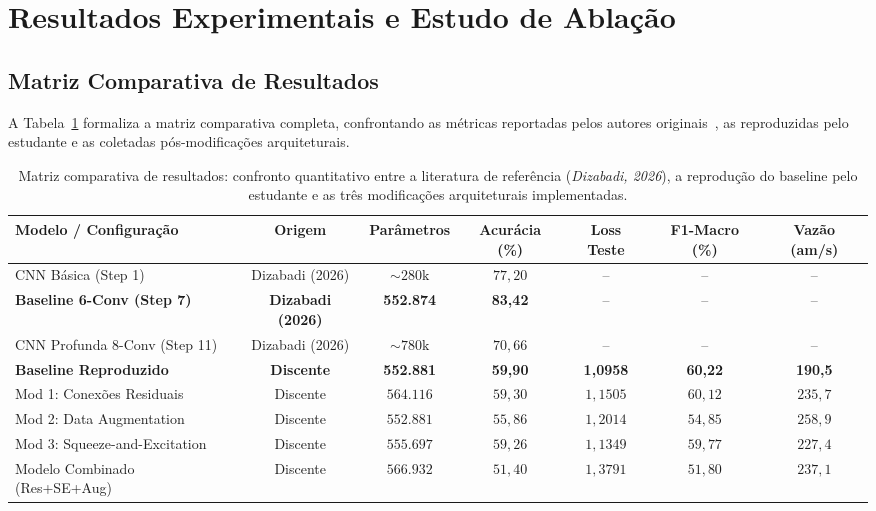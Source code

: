 \documentclass[runningheads]{llncs}
\begin{document}
\section{Resultados Experimentais e Estudo de Abla\c{c}\~{a}o}
\label{sec:resultados}

\subsection{Matriz Comparativa de Resultados}
A Tabela~\ref{tab:matriz_resultados} formaliza a matriz comparativa completa, confrontando as m\'{e}tricas reportadas pelos autores originais~\cite{dizabadi2026empirical}, as reproduzidas pelo estudante e as coletadas p\'{o}s-modifica\c{c}\~{o}es arquiteturais.

\begin{table}[t]
\centering
\caption{Matriz comparativa de resultados: confronto quantitativo entre a literatura de refer\^{e}ncia (\textit{Dizabadi, 2026}), a reprodu\c{c}\~{a}o do baseline pelo estudante e as tr\^{e}s modifica\c{c}\~{o}es arquiteturais implementadas.}
\label{tab:matriz_resultados}
\setlength{\tabcolsep}{5pt}
\small
\begin{tabular}{lcccccc}
\toprule
\textbf{Modelo / Configura\c{c}\~{a}o} & \textbf{Origem} & \textbf{Par\^{a}metros} & \textbf{Acur\'{a}cia (\%)} & \textbf{Loss Teste} & \textbf{F1-Macro (\%)} & \textbf{Vaz\~{a}o (am/s)} \\
\midrule
CNN B\'{a}sica (Step 1) & Dizabadi (2026) & $\sim 280\text{k}$ & $77{,}20$ & -- & -- & -- \\
\textbf{Baseline 6-Conv (Step 7)} & \textbf{Dizabadi (2026)} & \textbf{552.874} & \textbf{83,42} & -- & -- & -- \\
CNN Profunda 8-Conv (Step 11) & Dizabadi (2026) & $\sim 780\text{k}$ & $70{,}66$ & -- & -- & -- \\
\midrule
\textbf{Baseline Reproduzido} & \textbf{Discente} & \textbf{552.881} & \textbf{59,90} & \textbf{1,0958} & \textbf{60,22} & \textbf{190,5} \\
Mod 1: Conex\~{o}es Residuais & Discente & $564.116$ & $59{,}30$ & $1{,}1505$ & $60{,}12$ & $235{,}7$ \\
Mod 2: Data Augmentation & Discente & $552.881$ & $55{,}86$ & $1{,}2014$ & $54{,}85$ & $258{,}9$ \\
Mod 3: Squeeze-and-Excitation & Discente & $555.697$ & $59{,}26$ & $1{,}1349$ & $59{,}77$ & $227{,}4$ \\
Modelo Combinado (Res+SE+Aug) & Discente & $566.932$ & $51{,}40$ & $1{,}3791$ & $51{,}80$ & $237{,}1$ \\
\bottomrule
\end{tabular}
\end{table}
\end{document}
